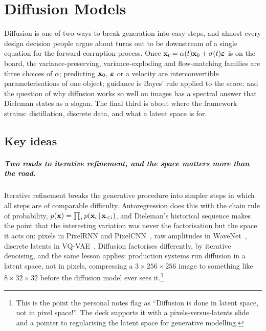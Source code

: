 \chapter{Diffusion Models}
\label{ch:03-diffusion-models}


Diffusion is one of two ways to break generation into easy steps, and almost every design
decision people argue about turns out to be downstream of a single equation for the forward
corruption process. Once
$\mathbf{x}_t = \alpha(t)\mathbf{x}_0 + \sigma(t)\boldsymbol{\varepsilon}$ is on the board, the variance-preserving,
variance-exploding and flow-matching families are three choices of $\alpha$; predicting
$\mathbf{x}_0$, $\boldsymbol{\varepsilon}$ or a velocity are interconvertible parameterisations of one object; guidance
is Bayes' rule applied to the score; and the question of why diffusion works so well on
images has a spectral answer that Dieleman states as a slogan. The final third is about
where the framework strains: distillation, discrete data, and what a latent space is for.

\section*{Key ideas}

\paragraph{Two roads to iterative refinement, and the space matters more than the road.}
Iterative refinement breaks the generative procedure into simpler steps in which all steps
are of comparable difficulty. Autoregression does this with the chain rule of probability,
$p(\mathbf{x}) = \prod_i p(\mathbf{x}_i \,|\, \mathbf{x}_{<i})$, and Dieleman's historical sequence makes the
point that the interesting variation was never the factorisation but the space it acts on:
pixels in PixelRNN and PixelCNN~\citep{oord2016pixelrnn}, raw amplitudes in
WaveNet~\citep{oord2016wavenet}, discrete latents in VQ-VAE~\citep{oord2017vqvae}. Diffusion
factorises differently, by iterative denoising, and the same lesson applies: production
systems run diffusion in a latent space, not in pixels, compressing a $3 \times 256 \times
256$ image to something like $8 \times 32 \times 32$ before the diffusion model ever sees
it.\footnote{This is the point the personal notes flag as ``Diffusion is done in latent
space, not in pixel space!''. The deck supports it with a pixels-versus-latents slide and a
pointer to regularising the latent space for generative modelling.}

